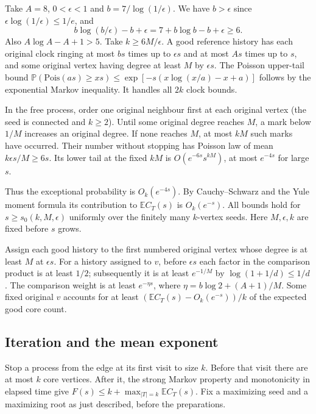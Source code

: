 \documentclass[11pt]{article}
\theoremstyle{remark}
\numberwithin{equation}{section}
\newcommand{\E}{\mathbb E}
\newcommand{\Prob}{\mathbb P}
\begin{document}
Take $A=8$, $0<\epsilon<1$ and $b=7/\log(1/\epsilon)$. We have $b>\epsilon$ since $\epsilon\log(1/\epsilon)\le1/e$, and
\[
 b\log(b/\epsilon)-b+\epsilon=7+b\log b-b+\epsilon\ge6 .
\] Also $A\log A-A+1>5$. Take $k\ge6M/\epsilon$. A good reference history has each original clock ringing at most $bs$ times up to $\epsilon s$ and at most $As$ times up to $s$, and some original vertex having degree at least $M$ by $\epsilon s$. The Poisson upper-tail bound $\Prob(\mathrm{Pois}(as)\ge xs)\le\exp[-s(x\log(x/a)-x+a)]$ follows by the exponential Markov inequality. It handles all $2k$ clock bounds.

In the free process, order one original neighbour first at each original vertex (the seed is connected and $k\ge2$). Until some original degree reaches $M$, a mark below $1/M$ increases an original degree. If none reaches $M$, at most $kM$ such marks have occurred. Their number without stopping has Poisson law of mean $k\epsilon s/M\ge6s$. Its lower tail at the fixed $kM$ is $O(e^{-6s}s^{kM})$, at most $e^{-4s}$ for large $s$.

Thus the exceptional probability is $O_k(e^{-4s})$. By Cauchy--Schwarz and the Yule moment formula its contribution to $\E C_T(s)$ is $O_k(e^{-s})$. All bounds hold for $s\ge s_0(k,M,\epsilon)$ uniformly over the finitely many $k$-vertex seeds. Here $M,\epsilon,k$ are fixed before $s$ grows.

Assign each good history to the first numbered original vertex whose degree is at least $M$ at $\epsilon s$. For a history assigned to $v$, before $\epsilon s$ each factor in the comparison product is at least $1/2$; subsequently it is at least $e^{-1/M}$ by $\log(1+1/d)\le1/d$. The comparison weight is at least $e^{-\eta s}$, where $\eta=b\log2+(A+1)/M$. Some fixed original $v$ accounts for at least $(\E C_T(s)-O_k(e^{-s}))/k$ of the expected good core count.

\subsection{Iteration and the mean exponent}
Stop a process from the edge at its first visit to size $k$. Before that visit there are at most $k$ core vertices. After it, the strong Markov property and monotonicity in elapsed time give $F(s)\le k+\max_{|T|=k}\E C_T(s)$. Fix a maximizing seed and a maximizing root as just described, before the preparations.
\end{document}

